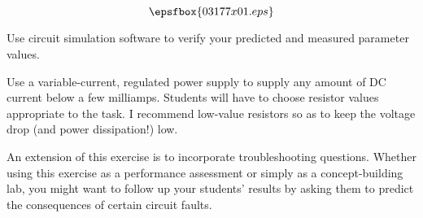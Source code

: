 

$$\epsfbox{03177x01.eps}$$

\vfil \eject






Use circuit simulation software to verify your predicted and measured parameter values.







Use a variable-current, regulated power supply to supply any amount of DC current below a few milliamps.  Students will have to choose resistor values appropriate to the task.  I recommend low-value resistors so as to keep the voltage drop (and power dissipation!) low.

An extension of this exercise is to incorporate troubleshooting questions.  Whether using this exercise as a performance assessment or simply as a concept-building lab, you might want to follow up your students' results by asking them to predict the consequences of certain circuit faults.




